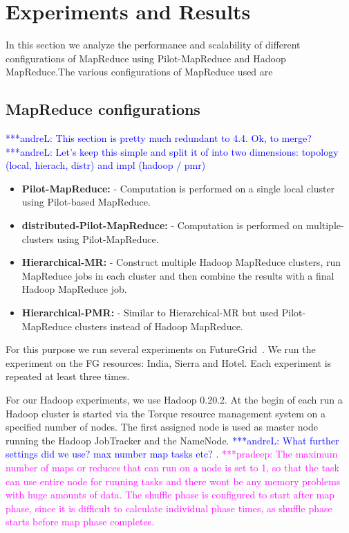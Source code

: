 \documentclass{acm_proc_article-sp}
\newcommand{\alnote}[1]{ {\textcolor{blue} { ***andreL: #1 }}}
\newcommand{\pnote}[1]{ {\textcolor{magenta} { ***pradeep: #1 }}}
\newcommand{\alnote}[1]{}
\newcommand{\pnote}[1]{}
\newcommand{\pilotmapreduce}{Pilot-MapReduce\xspace}
\begin{document}
\section{Experiments and Results}
\label{sec-experiments}

In this section we analyze the performance and scalability of different configurations of MapReduce using 
\pilotmapreduce and  Hadoop MapReduce.The various configurations of MapReduce used are


\subsection{MapReduce configurations}
\alnote{This section is pretty much redundant to 4.4. Ok, to merge?}
\alnote{Let's keep this simple and split it of into two dimensions: topology (local, hierach, distr) and impl (hadoop / pmr)}

\begin{itemize}
\item \textbf{\pilotmapreduce:}  - Computation is performed on a single local cluster using Pilot-based MapReduce.
\item \textbf{distributed-\pilotmapreduce:} - Computation is performed on multiple-clusters using \pilotmapreduce.
\item \textbf{Hierarchical-MR:} - Construct multiple Hadoop MapReduce clusters, run MapReduce jobs in each cluster and then combine the results with a final Hadoop MapReduce job. 
\item \textbf{Hierarchical-PMR:} - Similar to Hierarchical-MR but used \pilotmapreduce clusters instead of Hadoop MapReduce.
\end{itemize}

For this purpose we run several experiments
on FutureGrid~\cite{fg}. We run the experiment on the FG resources: India, 
Sierra and Hotel. Each experiment is repeated at least three times.

For our Hadoop experiments, we use Hadoop 0.20.2. At the begin of each run a 
Hadoop cluster is started via the Torque resource management system on a
specified number of nodes. The first assigned node is used as master node
running the Hadoop JobTracker and the NameNode. \alnote{What further settings
did we use? max number map tasks etc?}. \pnote{The maximum number of maps or 
reduces that can run on a node is set to 1, so that the task can use entire
node for running tasks and there wont be any memory problems with huge amounts
of data. The shuffle phase is configured to start after map phase, since it is
difficult to calculate individual phase times, as shuffle phase starts before
map phase completes.}
\end{document}
